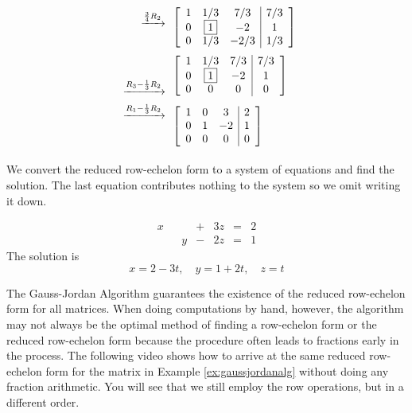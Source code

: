 \documentclass{ximera}
\begin{document}
\begin{example}
\begin{explanation}
\begin{align*}
\begin{array}{c}
 \xrightarrow{\frac{3}{4}R_2}\\
\\
\end{array}
&\left[\begin{array}{ccc|c}  
 1&1/3&7/3&7/3\\0&\fbox{$1$}&-2&1\\0&1/3&-2/3&1/3
 \end{array}\right]\\
 \begin{array}{c}
\\
\\
 \xrightarrow{R_3-\frac{1}{3}R_2}\\
\end{array}
&\left[\begin{array}{ccc|c}  
 1&1/3&7/3&7/3\\0&\fbox{$1$}&-2&1\\0&0&0&0
 \end{array}\right]\\
 \begin{array}{c}
 \xrightarrow{R_1-\frac{1}{3}R_2}\\
 \\
\\
\end{array}
&\left[\begin{array}{ccc|c}  
 1&0&3&2\\0&1&-2&1\\0&0&0&0
 \end{array}\right]
 \end{align*}
 
 We convert the reduced row-echelon form to a system of equations and find the solution.  The last equation contributes nothing to the system so we omit writing it down.
 
 $$\begin{array}{ccccccccc}
      x & &&+&3z&= &2 \\
	 & &y&-&2z&=&1
    \end{array}$$
    The solution is
    $$x=2-3t,\quad y=1+2t,\quad z=t$$
\end{explanation}
\end{example}
The Gauss-Jordan Algorithm guarantees the existence of the reduced row-echelon form for all matrices.  
When doing computations by hand, however, the algorithm may not always be the optimal method of finding a row-echelon form or the reduced row-echelon form because the procedure often leads to fractions early in the process. 
The following video shows how to arrive at the same reduced row-echelon form for the matrix in Example \ref{ex:gaussjordanalg} without doing any fraction arithmetic.  You will see that we still employ the row operations, but in a different order.
\end{document}
